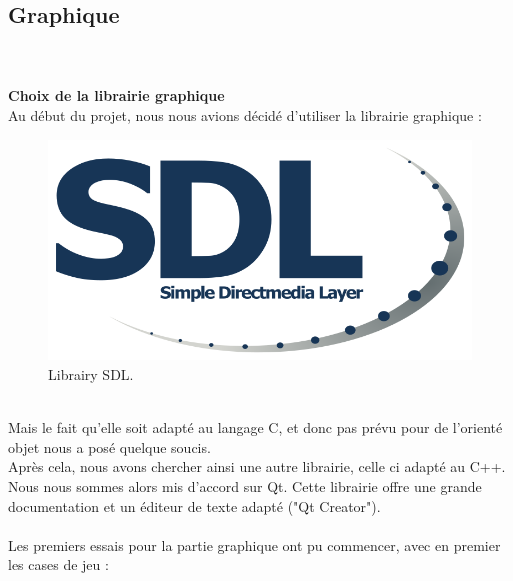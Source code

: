 \documentclass{article}
\begin{document}
\subsection{Graphique}
~\\~\\
\textbf{\large Choix de la librairie graphique}
~\\
Au début du projet, nous nous avions décidé d'utiliser la librairie graphique : 
~\\
\begin{figure}[!h]
\centering
\includegraphics[scale=0.2]{Images/logoSDL.png}
\caption{Librairy SDL.}
\end{figure}
~\\
Mais le fait qu'elle soit adapté au langage C, et donc pas prévu pour de l'orienté objet nous a posé quelque soucis.\\
Après cela, nous avons chercher ainsi une autre librairie, celle ci adapté au C++.\\
Nous nous sommes alors mis d'accord sur Qt. Cette librairie offre une grande documentation et un éditeur de texte adapté ("Qt Creator").
~\\~\\
Les premiers essais pour la partie graphique ont pu commencer, avec en premier les cases de jeu :
\end{document}
